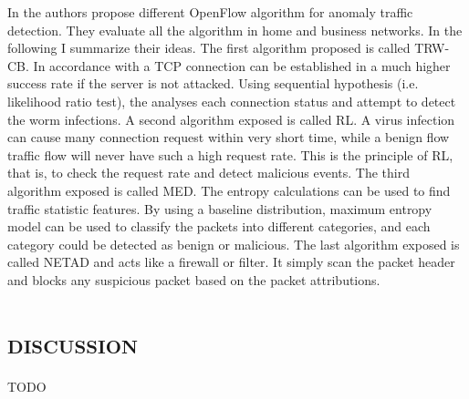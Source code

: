 In \cite{sdn-anomaly-traffic-detection} the authors propose different OpenFlow algorithm for anomaly traffic detection. They evaluate all the algorithm in home and business networks. In the following I summarize their ideas. The first algorithm proposed is called \ac{TRW-CB}. In accordance with a \ac{TCP} connection can be established in a much higher success rate if the server is not attacked. Using sequential hypothesis (i.e. likelihood ratio test), the analyses each connection status and attempt to detect the worm infections. A second algorithm exposed is called \ac{RL}. A virus infection can cause many connection request within very short time, while a benign flow traffic flow will never have such a high request rate. This is the principle of \ac{RL}, that is, to check the request rate and  detect malicious events. The third algorithm exposed is called \ac{MED}. The entropy calculations can be used to find traffic statistic features. By using a baseline distribution, maximum entropy model can be used to classify the packets into different categories, and each category could be detected as benign or malicious. The last algorithm exposed is called \ac{NETAD} and acts like a firewall or filter. It simply scan the packet header and blocks any suspicious packet based on the packet attributions.

\section*{\small \textsc{discussion}}
TODO